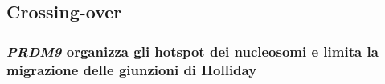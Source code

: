\subsection{Crossing-over}

\subsubsection{\emph{PRDM9} organizza gli hotspot dei nucleosomi e limita la migrazione delle giunzioni di Holliday}



